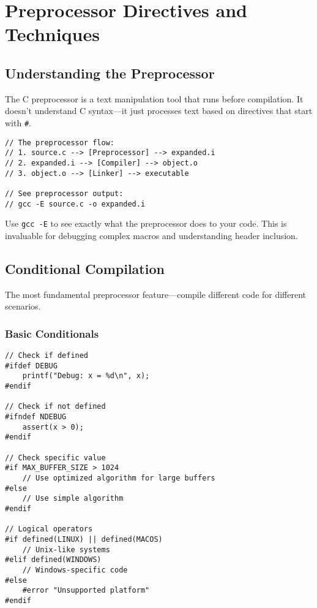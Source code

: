 \chapter{Preprocessor Directives and Techniques}

\section{Understanding the Preprocessor}

The C preprocessor is a text manipulation tool that runs before compilation. It doesn't understand C syntax---it just processes text based on directives that start with \texttt{\#}.

\begin{lstlisting}
// The preprocessor flow:
// 1. source.c --> [Preprocessor] --> expanded.i
// 2. expanded.i --> [Compiler] --> object.o
// 3. object.o --> [Linker] --> executable

// See preprocessor output:
// gcc -E source.c -o expanded.i
\end{lstlisting}

\begin{tipbox}
Use \texttt{gcc -E} to see exactly what the preprocessor does to your code. This is invaluable for debugging complex macros and understanding header inclusion.
\end{tipbox}

\section{Conditional Compilation}

The most fundamental preprocessor feature---compile different code for different scenarios.

\subsection{Basic Conditionals}

\begin{lstlisting}
// Check if defined
#ifdef DEBUG
    printf("Debug: x = %d\n", x);
#endif

// Check if not defined
#ifndef NDEBUG
    assert(x > 0);
#endif

// Check specific value
#if MAX_BUFFER_SIZE > 1024
    // Use optimized algorithm for large buffers
#else
    // Use simple algorithm
#endif

// Logical operators
#if defined(LINUX) || defined(MACOS)
    // Unix-like systems
#elif defined(WINDOWS)
    // Windows-specific code
#else
    #error "Unsupported platform"
#endif
\end{lstlisting}

